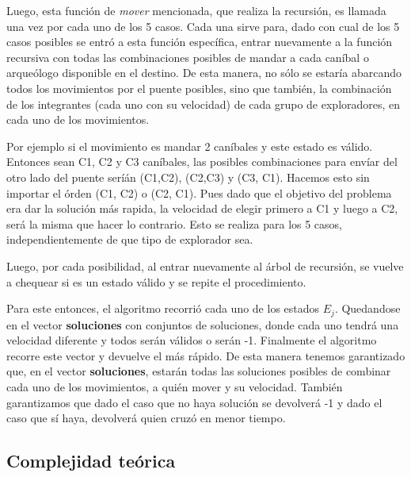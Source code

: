        Luego, esta función de \emph{mover} mencionada, que realiza la recursión, es llamada una vez por cada uno de los 5 casos. Cada una sirve para, dado con cual de los 5 casos posibles se entró a esta función específica, entrar nuevamente a la función recursiva con todas las combinaciones posibles de mandar a cada caníbal o arqueólogo disponible en el destino. De esta manera, no sólo se estaría abarcando todos los movimientos por el puente posibles, sino que también, la combinación de los integrantes (cada uno con su velocidad) de cada grupo de exploradores, en cada uno de los movimientos.

       Por ejemplo si el movimiento es mandar 2 caníbales y este estado es válido. Entonces sean C1, C2 y C3 caníbales, las posibles combinaciones para envíar del otro lado del puente seríán (C1,C2), (C2,C3) y (C3, C1). Hacemos esto sin importar el órden (C1, C2) o (C2, C1). Pues dado que el objetivo del problema era dar la solución más rapida, la velocidad de elegir primero a C1 y luego a C2, será la misma que hacer lo contrario. Esto se realiza para los 5 casos, independientemente de que tipo de explorador sea.

       Luego, por cada posibilidad, al entrar nuevamente al árbol de recursión, se vuelve a chequear si es un estado válido y se repite el procedimiento. 

       Para este entonces, el algoritmo recorrió cada uno de los estados $E_{j}$. Quedandose en el vector \textbf{soluciones} con conjuntos de soluciones, donde cada uno tendrá una velocidad diferente y todos serán válidos o serán -1. Finalmente el algoritmo recorre este vector y devuelve el más rápido. De esta manera tenemos garantizado que, en el vector \textbf{soluciones}, estarán todas las soluciones posibles de combinar cada uno de los movimientos, a quién mover y su velocidad. También garantizamos que dado el caso que no haya solución se devolverá -1 y dado el caso que sí haya, devolverá quien cruzó en menor tiempo.



    \subsection{Complejidad teórica}

